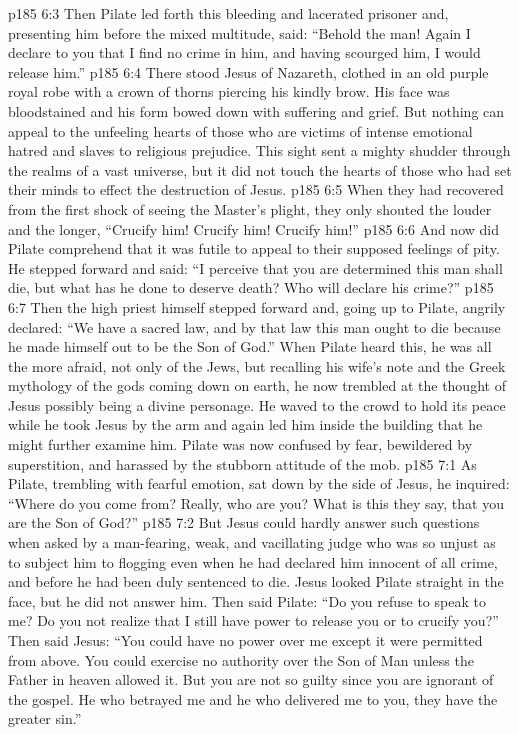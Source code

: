 \vs p185 6:3 Then Pilate led forth this bleeding and lacerated prisoner and, presenting him before the mixed multitude, said: “Behold the man! Again I declare to you that I find no crime in him, and having scourged him, I would release him.”
\vs p185 6:4 There stood Jesus of Nazareth, clothed in an old purple royal robe with a crown of thorns piercing his kindly brow. His face was bloodstained and his form bowed down with suffering and grief. But nothing can appeal to the unfeeling hearts of those who are victims of intense emotional hatred and slaves to religious prejudice. This sight sent a mighty shudder through the realms of a vast universe, but it did not touch the hearts of those who had set their minds to effect the destruction of Jesus.
\vs p185 6:5 When they had recovered from the first shock of seeing the Master’s plight, they only shouted the louder and the longer, “Crucify him! Crucify him! Crucify him!”
\vs p185 6:6 And now did Pilate comprehend that it was futile to appeal to their supposed feelings of pity. He stepped forward and said: “I perceive that you are determined this man shall die, but what has he done to deserve death? Who will declare his crime?”
\vs p185 6:7 Then the high priest himself stepped forward and, going up to Pilate, angrily declared: “We have a sacred law, and by that law this man ought to die because he made himself out to be the Son of God.” When Pilate heard this, he was all the more afraid, not only of the Jews, but recalling his wife’s note and the Greek mythology of the gods coming down on earth, he now trembled at the thought of Jesus possibly being a divine personage. He waved to the crowd to hold its peace while he took Jesus by the arm and again led him inside the building that he might further examine him. Pilate was now confused by fear, bewildered by superstition, and harassed by the stubborn attitude of the mob.\plusone
{}
\vs p185 7:1 As Pilate, trembling with fearful emotion, sat down by the side of Jesus, he inquired: “Where do you come from? Really, who are you? What is this they say, that you are the Son of God?”
\vs p185 7:2 But Jesus could hardly answer such questions when asked by a man\hyp{}fearing, weak, and vacillating judge who was so unjust as to subject him to flogging even when he had declared him innocent of all crime, and before he had been duly sentenced to die. Jesus looked Pilate straight in the face, but he did not answer him. Then said Pilate: “Do you refuse to speak to me? Do you not realize that I still have power to release you or to crucify you?” Then said Jesus: \textcolor{ubdarkred}{“You could have no power over me except it were permitted from above. You could exercise no authority over the Son of Man unless the Father in heaven allowed it. But you are not so guilty since you are ignorant of the gospel. He who betrayed me and he who delivered me to you, they have the greater sin.”}
